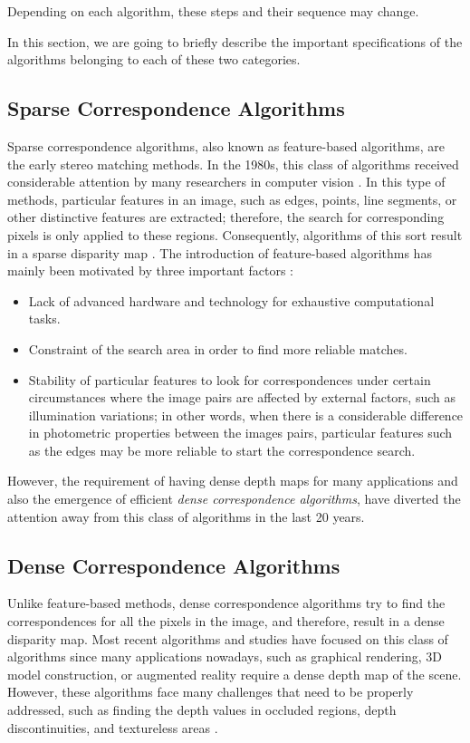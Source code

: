 Depending on each algorithm, these steps and their sequence may change.

In this section, we are going to briefly describe the important specifications of the algorithms belonging to each of these two categories.
\subsection{Sparse Correspondence Algorithms}
Sparse correspondence algorithms, also known as feature-based algorithms, are the early stereo matching methods. In the 1980s, this class of algorithms received considerable attention by
many researchers in computer vision \cite{dhon89}.
In this type of methods, particular features in an image, such as edges, 
points, line segments, or other distinctive features are extracted; therefore, the search for corresponding pixels is only applied to these regions. 
Consequently, algorithms of this
sort result in a sparse disparity map \cite{matt89,hsie92, sze11}. The introduction of feature-based algorithms has mainly been motivated by three important factors \cite{bro03,sze11}:
\begin{itemize}
\item Lack of advanced hardware and technology for exhaustive computational tasks.
\item Constraint of the search area in order to find more reliable matches.
\item Stability of particular features to look for correspondences under certain circumstances where the image pairs are affected by external factors, 
such as illumination variations; in other words, when there is a considerable difference in photometric properties between the images pairs, 
particular features such as the edges may be more reliable to start the correspondence search.
\end{itemize}

However, the requirement of having dense depth maps for many applications and also the emergence of efficient {\it dense correspondence algorithms}, have diverted the attention away
from this class of algorithms in the last 20 years.

\subsection{Dense Correspondence Algorithms}
Unlike feature-based methods, dense correspondence algorithms try to find the
correspondences for all the pixels in the image, and therefore, result in a dense disparity map. Most recent algorithms and studies have focused on this class of algorithms since many applications 
nowadays, such as graphical rendering, 3D model construction, or augmented reality require a dense depth map of the scene. 
However, these algorithms face many challenges that need to be properly
addressed, such as finding the depth values in occluded regions, depth discontinuities, and textureless areas \cite{sch02,bro03}.

